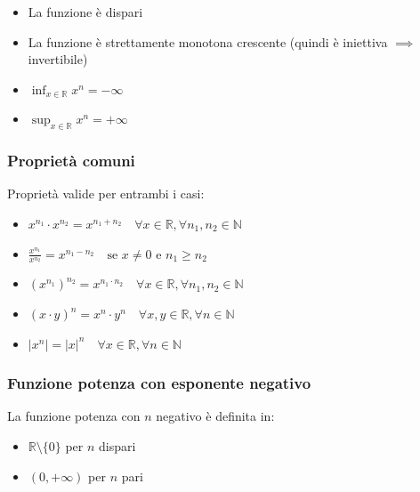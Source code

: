 \begin{itemize}
\item La funzione è dispari
\item La funzione è strettamente monotona crescente (quindi è iniettiva $\implies$ invertibile)
\item $\inf_{x \in \mathbb{R}} x^n = -\infty$
\item $\sup_{x \in \mathbb{R}} x^n = +\infty$
\end{itemize}

\subsubsection{Proprietà comuni}
Proprietà valide per entrambi i casi:
\begin{itemize}
\item $x^{n_1} \cdot x^{n_2} = x^{n_1+n_2} \quad \forall x \in \mathbb{R}, \forall n_1, n_2 \in \mathbb{N}$
\item $\frac{x^{n_1}}{x^{n_2}} = x^{n_1-n_2} \quad \text{se } x \neq 0 \text{ e } n_1 \geq n_2$
\item $(x^{n_1})^{n_2} = x^{n_1 \cdot n_2} \quad \forall x \in \mathbb{R}, \forall n_1, n_2 \in \mathbb{N}$
\item $(x \cdot y)^n = x^n \cdot y^n \quad \forall x, y \in \mathbb{R}, \forall n \in \mathbb{N}$
\item $|x^n| = |x|^n \quad \forall x \in \mathbb{R}, \forall n \in \mathbb{N}$
\end{itemize}



\subsubsection{Funzione potenza con esponente negativo}

La funzione potenza con $n$ negativo è definita in:
\begin{itemize}
\item $\mathbb{R} \setminus \{0\}$ per $n$ dispari
\item $(0, +\infty)$ per $n$ pari
\end{itemize}

